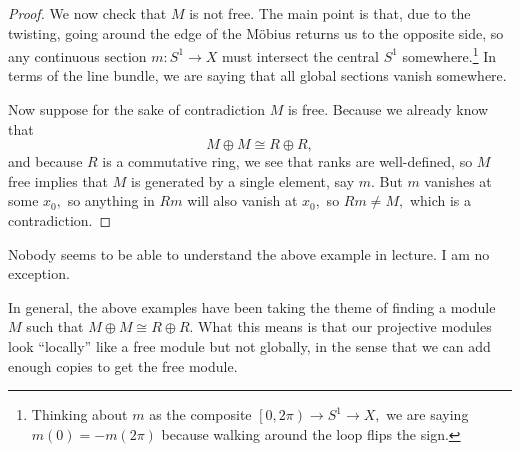 \begin{proof}
	We now check that $M$ is not free. The main point is that, due to the twisting, going around the edge of the M\"obius returns us to the opposite side, so any continuous section $m:S^1\to X$ must intersect the central $S^1$ somewhere.\footnote{Thinking about $m$ as the composite $\left[0,2\pi\right)\to S^1\to X,$ we are saying $m(0)=-m(2\pi)$ because walking around the loop flips the sign.} In terms of the line bundle, we are saying that all global sections vanish somewhere.
	
	Now suppose for the sake of contradiction $M$ is free. Because we already know that
	\[M\oplus M\cong R\oplus R,\]
	and because $R$ is a commutative ring, we see that ranks are well-defined, so $M$ free implies that $M$ is generated by a single element, say $m.$ But $m$ vanishes at some $x_0,$ so anything in $Rm$ will also vanish at $x_0,$ so $Rm\ne M,$ which is a contradiction.
\end{proof}
\begin{remark}
	Nobody seems to be able to understand the above example in lecture. I am no exception.
\end{remark}
In general, the above examples have been taking the theme of finding a module $M$ such that $M\oplus M\cong R\oplus R.$ What this means is that our projective modules look ``locally'' like a free module but not globally, in the sense that we can add enough copies to get the free module.



